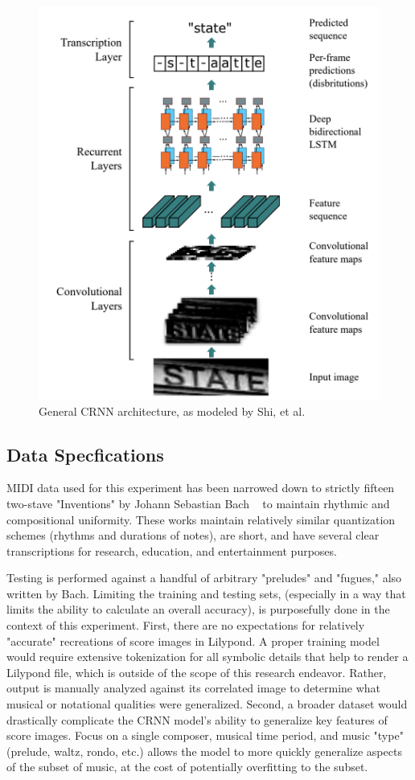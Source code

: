 \documentclass[nonacm, sigconf]{acmart}
\begin{document}
\begin{figure}
	\centering
	\includegraphics[width = .8\linewidth]{./figures/crnn_arch.png}
	\caption{General CRNN architecture, as modeled by Shi, et al. ~\cite{shi2015endtoend}}
	\label{fig:crnn-arch}
\end{figure}

\subsection{Data Specfications}
MIDI data used for this experiment has been narrowed down to strictly fifteen two-stave "Inventions" by Johann Sebastian Bach ~\cite{bach_midi} to maintain rhythmic and compositional uniformity.
These works maintain relatively similar quantization schemes (rhythms and durations of notes), are short, and have several clear transcriptions for research, education, and entertainment purposes.

Testing is performed against a handful of arbitrary "preludes" and "fugues," also written by Bach. 
Limiting the training and testing sets, (especially in a way that limits the ability to calculate an overall accuracy), is purposefully done in the context of this experiment.
First, there are no expectations for relatively "accurate" recreations of score images in Lilypond. 
A proper training model would require extensive tokenization for all symbolic details that help to render a Lilypond file, which is outside of the scope of this research endeavor.
Rather, output is manually analyzed against its correlated image to determine what musical or notational qualities were generalized.
Second, a broader dataset would drastically complicate the CRNN model's ability to generalize key features of score images.
Focus on a single composer, musical time period, and music "type" (prelude, waltz, rondo, etc.) allows the model to more quickly generalize aspects of the subset of music, at the cost of potentially overfitting to the subset.
\end{document}
